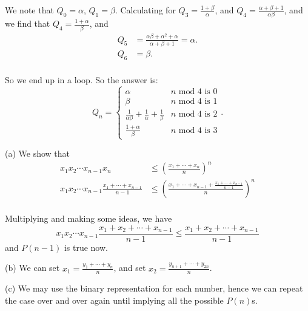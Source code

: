 We note that $Q_0 = \alpha$, $Q_1 = \beta$. Calculating for
$Q_3=\frac{1+\beta}{\alpha}$, and $Q_4=\frac{\alpha+\beta+1}{\alpha\beta}$, and
we find that $Q_4=\frac{1+\alpha}{\beta}$, and 
\begin{align*}
    Q_5&=\frac{\alpha\beta+\alpha^2+\alpha}{\alpha+\beta+1}=\alpha. \\
    Q_6 &= \beta. \\
\end{align*}

So we end up in a loop. So the answer is: 
\[
    Q_n = \begin{cases}
        \alpha & n \text{ mod 4 is 0}\\
        \beta & n \text{ mod 4 is 1}\\
        \frac{1}{\alpha\beta}+\frac{1}{\alpha}+\frac{1}{\beta} & n\text{ mod 4 is
        2}\\
            \frac{1+\alpha}{\beta}& n \text{ mod 4 is 3}
    \end{cases}.
\]

 (a) We show that 
\begin{align*}
    x_1x_2\cdots x_{n-1} x_n &\leq \left( \frac{x_1+\cdots +x_n}{n}  \right)^n
    \\
    x_1x_2\cdots x_{n-1} \frac{x_1+\cdots+x_{n-1}}{n-1} &\leq \left(\frac{
x_1+\cdots+x_{n-1}+\frac{x_1+\cdots +x_{n-1}}{n-1}}{n} \right) ^n \\ 
\end{align*}

Multiplying and making some ideas, we have 
\[
    x_1x_2\cdots x_{n-1}\frac{x_1+x_2+\cdots+x_{n-1}}{n-1} \leq  \frac{x_1+x_2+\cdots +x_{n-1}}{n-1}
\]
and $P(n-1)$ is true now.

(b) We can set $x_1=\frac{y_1+\cdots+y_n}{n}$, and set $x_2=\frac{y_{n+1}+\cdots + y_{2n}}{n}$. 

(c) We may use the binary representation for each number, hence we can repeat the
case over and over again until implying all the possible $P(n)$s. 

